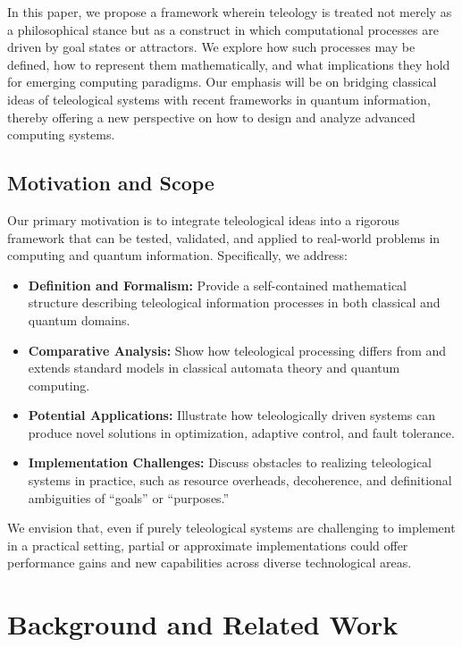 \documentclass[12pt]{article}
\begin{document}
In this paper, we propose a framework wherein teleology is treated not merely as a philosophical stance but as a construct in which computational processes are driven by goal states or attractors. We explore how such processes may be defined, how to represent them mathematically, and what implications they hold for emerging computing paradigms. Our emphasis will be on bridging classical ideas of teleological systems with recent frameworks in quantum information, thereby offering a new perspective on how to design and analyze advanced computing systems.

\subsection{Motivation and Scope}

Our primary motivation is to integrate teleological ideas into a rigorous framework that can be tested, validated, and applied to real-world problems in computing and quantum information. Specifically, we address:
\begin{itemize}
    \item \textbf{Definition and Formalism:} Provide a self-contained mathematical structure describing teleological information processes in both classical and quantum domains.
    \item \textbf{Comparative Analysis:} Show how teleological processing differs from and extends standard models in classical automata theory and quantum computing.
    \item \textbf{Potential Applications:} Illustrate how teleologically driven systems can produce novel solutions in optimization, adaptive control, and fault tolerance.
    \item \textbf{Implementation Challenges:} Discuss obstacles to realizing teleological systems in practice, such as resource overheads, decoherence, and definitional ambiguities of ``goals'' or ``purposes.''
\end{itemize}

We envision that, even if purely teleological systems are challenging to implement in a practical setting, partial or approximate implementations could offer performance gains and new capabilities across diverse technological areas.

\section{Background and Related Work}
\end{document}
